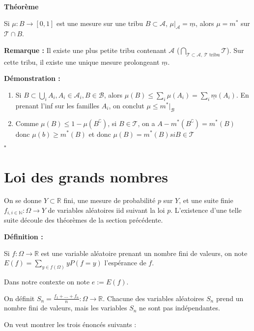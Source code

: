 \documentclass[10pt,a4paper,notitlepage ]{report}
\newcommand{\N}{\mathbb N}
\newcommand{\R}{\mathbb R}
\newcommand{\T}{\mathcal T}
\newcommand{\A}{\mathcal A}
\newcommand{\B}{\mathcal B}
\newcommand{\1}{\mathds 1}
\newcommand{\comp}[1]{#1^\complement}
\newenvironment{definition}[1][]{
	
	\textbf{Définition #1 : }
}
{}
\newcounter{th}
\newenvironment{theorem}[1][]{
\refstepcounter{th}
\begin{tcolorbox}
	\textbf{Théorème \theth \ #1}
	
	
}{\end{tcolorbox}}
\newenvironment{demo}[1][]{

	\textbf{Démonstration #1 :}
}{\begin{flushright}
	$\square$
\end{flushright}
}
\newenvironment{rem}{
	
		\textbf{Remarque :}}{}
\begin{document}
\begin{theorem}
	Si $\mu : B \rightarrow [0,1]$ est une mesure sur une tribu $B \subset \A$, $\mu|_\A = \underline m$, alors $\mu=m^*$ sur $\T \cap B$.
\end{theorem}

\begin{rem}
	Il existe une plus petite tribu contenant $\A$ ($\underset{\T \subset \A,\ \T \text{ tribu}}{\bigcap} \T$). Sur cette tribu, il existe une unique mesure prolongeant $\underline m$.
\end{rem}

\begin{demo}
	\begin{enumerate}
		\item Si $B \subset \underset i \bigcup A_i, A_i \in \A_i, B \in \B$, alors $\mu(B) \le \underset i \sum \mu(A_i) = \underset i \sum \underline m(A_i)$. En prenant l'inf sur les familles $A_i$, on conclut $\mu \le m^*|_\B$
		\item Comme $\mu(B) \le 1- \mu(\comp B)$, si $B \in \T$, on a $A-m^*(\comp B) = m^*(B)$ donc $\mu(b) \ge m^*(B)$ et donc $\mu(B) = m^*(B) si B\in \T$
	
	\end{enumerate}
\end{demo}

\section{Loi des grands nombres}

On se donne $Y \subset \R$ fini, une mesure de probabilité $p$ sur $Y$, et une suite finie $f_{i,i\in\N} : \Omega \rightarrow Y$ de variables aléatoires iid suivant la loi $p$. L'existence d'une telle suite découle des théorèmes de la section précédente.

\begin{definition}
	Si $f : \Omega \rightarrow \R$ est une variable aléatoire prenant un nombre fini de valeurs, on note $E(f) = \underset{y \in f(\Omega)} \sum yP(f=y)$ l'espérance de $f$.
\end{definition}

Dans notre contexte on note $e := E(f)$.

On définit $S_n = \frac{f_1 + \dots + f_n} n : \Omega \rightarrow \R$. Chacune des variables aléatoires $S_n$ prend un nombre fini de valeurs, mais les variables $S_n$ ne sont pas indépendantes.

On veut montrer les trois énoncés suivants :
\end{document}
